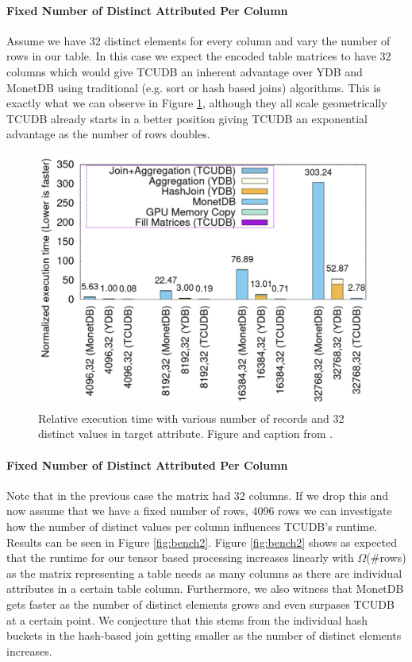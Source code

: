 \documentclass{paper}
\begin{document}
\paragraph{Fixed Number of Distinct Attributed Per Column}
Assume we have 32 distinct elements for every column and vary the number of rows in our table.
	In this case we expect the encoded table matrices to have 32 columns which would give TCUDB an inherent advantage over YDB and MonetDB using traditional (e.g. sort or hash based joins) algorithms. This is exactly what we can observe in Figure \ref{fig:bench1}, although they all scale geometrically TCUDB already starts in a better position giving TCUDB an exponential advantage as the number of rows doubles. 
	\begin{figure}
		\centering
		\includegraphics[width=0.9\linewidth]{bench1}
		\caption{Relative execution time with various number of records and 32 distinct values in target attribute. Figure and caption from \cite{hu2021tcudb}.}
		\label{fig:bench1}
	\end{figure}
	
\paragraph{Fixed Number of Distinct Attributed Per Column}
Note that in the previous case the matrix had 32 columns. If we drop this and now assume that we have a fixed number of rows, 4096 rows we can investigate how the number of distinct values per column influences TCUDB's runtime. Results can be seen in Figure \ref{fig:bench2}. Figure \ref{fig:bench2} shows as expected that the runtime for our tensor based processing increases linearly with $\Omega$(\#rows) as the matrix representing a table needs as many columns as there are individual attributes in a certain table column. Furthermore, we also witness that MonetDB gets faster as the number of distinct elements grows and even surpases TCUDB at a certain point. We conjecture that this stems from the individual hash buckets in the hash-based join getting smaller as the number of distinct elements increases.
\end{document}
